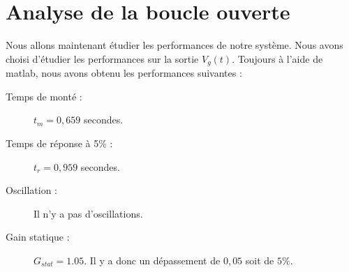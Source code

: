 	\section{Analyse de la boucle ouverte}
Nous allons maintenant étudier les performances de notre système. Nous avons choisi d'étudier les performances sur la sortie $V_g(t)$. 
Toujours à l'aide de matlab, nous avons obtenu les performances suivantes : 
\begin{description}
\item[Temps de monté :] $t_m = 0,659 $ secondes.
\item[Temps de réponse à 5\% :] $t_r = 0,959$ secondes.
\item[Oscillation :] Il n'y a pas d'oscillations.
\item[Gain statique :] $G_{stat}= 1.05$. Il y a donc un dépassement de $0,05$ soit de $5\%$.	
\end{description}	
